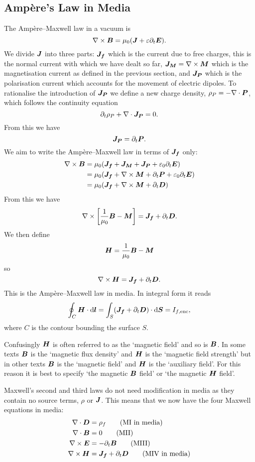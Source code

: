     \subsection{Amp\`ere's Law in Media}
    The Amp\`ere--Maxwell law in a vacuum is
    \[\nabla\times\bm{B} = \mu_0(\bm{J} + \varepsilon\partial_t\bm{E}).\]
    We divide \(\bm{J}\) into three parts: \(\bm{J_f}\) which is the current due to free charges, this is the normal current with which we have dealt so far, \(\bm{J_M} = \nabla\times\bm{M}\) which is the magnetisation current as defined in the previous section, and \(\bm{J_P}\) which is the polarisation current which accounts for the movement of electric dipoles.
    To rationalise the introduction of \(\bm{J_P}\) we define a new charge density, \(\rho_P = -\nabla\cdot\bm{P}\), which follows the continuity equation
    \[\partial_t \rho_P + \nabla\cdot\bm{J_P} = 0.\]
    From this we have
    \[\bm{J_P} = \partial_t\bm{P}.\]
    We aim to write the Amp\`ere--Maxwell law in terms of \(\bm{J_f}\) only:
    \begin{align*}
        \nabla\times\bm{B} &= \mu_0 (\bm{J_f} + \bm{J_M} + \bm{J_P} + \varepsilon_0\partial_t\bm{E})\\
        &= \mu_0(\bm{J_f} + \nabla\times\bm{M} + \partial_t\bm{P} + \varepsilon_0\partial_t\bm{E})\\
        &= \mu_0(\bm{J_f} + \nabla\times\bm{M} + \partial_t\bm{D})
    \end{align*}
    From this we have
    \[\nabla\times\left[\frac{1}{\mu_0}\bm{B} - \bm{M}\right] = \bm{J_f} + \partial_t\bm{D}.\]
    We then define
    \[\bm{H} = \frac{1}{\mu_0}\bm{B} - \bm{M}\]
    so
    \[\nabla\times\bm{H} = \bm{J_f} + \partial_t\bm{D}.\]
    This is the Amp\`ere--Maxwell law in media.
    In integral form it reads
    \[\oint_C \bm{H}\cdot\dd{\bm{l}} = \int_S (\bm{J_f} + \partial_t\bm{D})\cdot\dd{\bm{S}} = I_{f, {\mathrm{enc}}},\]
    where \(C\) is the contour bounding the surface \(S\).
    
    Confusingly \(\bm{H}\) is often referred to as the `magnetic field' and so is \(\bm{B}\).
    In some texts \(\bm{B}\) is the `magnetic flux density' and \(\bm{H}\) is the `magnetic field strength' but in other texts \(\bm{B}\) is the `magnetic field' and \(\bm{H}\) is the `auxiliary field'.
    For this reason it is best to specify `the magnetic \(\bm{B}\) field' or `the magnetic \(\bm{H}\) field'.
    
    Maxwell's second and third laws do not need modification in media as they contain no source terms, \(\rho\) or \(\bm{J}\).
    This means that we now have the four Maxwell equations in media:
    \begin{align*}
        \nabla\cdot\bm{D} &= \rho_f \tag{MI in media}\\
        \nabla\cdot\bm{B} &= 0 \tag{MII}\\
        \nabla\times\bm{E} &= -\partial_t\bm{B} \tag{MIII}\\
        \nabla\times\bm{H} &= \bm{J_f} + \partial_t\bm{D} \tag{MIV in media}
    \end{align*}
    
